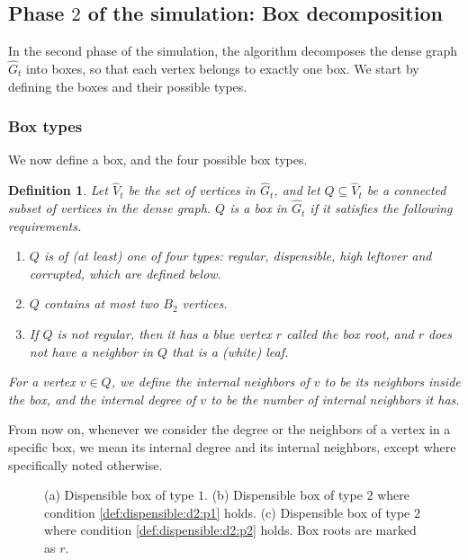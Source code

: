 \documentclass[11pt]{article}
\def\dnsitem{\vspace{-7pt}\item}
\newtheorem{definition}[theorem]{Definition}
\theoremstyle{definition}
\begin{document}
\subsection{Phase $2$ of the simulation: Box decomposition}
\label{sub:alg_decomp}

In the second phase of the simulation, the algorithm decomposes the dense graph $\hat{G}_t$ into boxes, so that each vertex belongs to exactly one box.
We start by defining the boxes and their possible types.

\subsubsection{Box types}
\label{sub:box_types}

We now define a box, and the four possible box types.

\begin{definition}
\label{def:box_general}
Let $\hat{V}_t$ be the set of vertices in $\hat{G}_t$, and let $Q \subseteq \hat{V}_t$ be a connected subset of vertices in the dense graph.
$Q$ is a \emph{box} in $\hat{G}_t$ if it satisfies the following requirements.
\begin{enumerate}
	\dnsitem $Q$ is of (at least) one of four types: \emph{regular}, \emph{dispensible}, \emph{high leftover} and \emph{corrupted}, which are defined below.
	\dnsitem $Q$ contains at most two $B_2$ vertices.
	\dnsitem If $Q$ is not regular, then it has a blue vertex $r$ called the \emph{box root}, and $r$ does not have a neighbor in $Q$ that is a (white) leaf. 
\end{enumerate}
For a vertex $v \in Q$, we define the \emph{internal neighbors} of $v$ to be its neighbors inside the box, and the \emph{internal degree} of $v$ to be the number of internal neighbors it has.
\end{definition}

From now on,
whenever we consider the degree or the neighbors of a vertex in a specific box, 
we mean its internal degree and its internal neighbors, 
except where specifically noted otherwise.

\begin{figure}[thbp]
  \caption{\sf (a) Dispensible box of type $1$. 
	      (b) Dispensible box of type $2$ where condition \ref{def:dispensible:d2:p1} holds.
	      (c) Dispensible box of type $2$ where condition \ref{def:dispensible:d2:p2} holds.
	      Box roots are marked as $r$.}
  \medskip
  \centering
  \label{fig:dispensible}
\end{figure}
\end{document}
